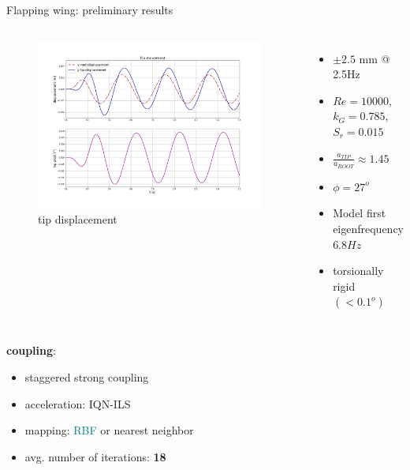 \documentclass[10pt,t]{beamer}
\begin{document}
\begin{frame}{Flapping wing: preliminary results}

    \begin{columns}
        \vspace{-0.5cm}
        \begin{figure}
	    \centering
	        \includegraphics[width=0.98\textwidth, trim=0 60 0 60, clip]{images/heathcote/naca0012_disp.png}
	        \caption{tip displacement}
        \end{figure}
        \vspace{0.15cm}

        \footnotesize
        \begin{itemize}
            \item $\pm2.5$ mm @ 2.5Hz
            \item $Re=10000$, $k_G=0.785$, $S_r=0.015$
            \item $\frac{a_{TIP}}{a_{ROOT}} \approx 1.45$
            \item $\phi = 27^o$
            \item Model first eigenfrequency $6.8Hz$
            \item torsionally rigid $(< 0.1^o)$
        \end{itemize}

\end{columns}
\footnotesize
\textcolor{dorange}{\textbf{coupling}}:
\begin{itemize}
    \item staggered strong coupling
    \item acceleration: \textcolor{pblue}{IQN-ILS}
    \item mapping: \textcolor{teal}{RBF} or \textcolor{dblue}{nearest neighbor}
    \item avg. number of iterations: \textbf{18}
\end{itemize}

    
\end{frame}
\end{document}
